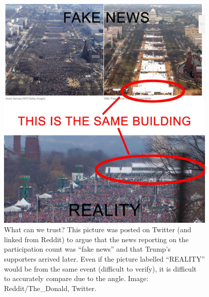 \begin{columns}[t]
  \hfill

  \begin{column}{0.32\linewidth}

    \begin{figure}
      \centering
      \includegraphics[width=0.9\linewidth]{fig/trump.jpg}
      \caption{%
        What can we trust?
        This picture was posted on Twitter (and linked from Reddit) to argue 
        that the news reporting on the participation count was \enquote{fake 
          news} and that Trump's supporters arrived later.
        Even if the picture labelled \enquote{REALITY} would be from the same 
        event (difficult to verify), it is difficult to accurately compare due 
        to the angle.
        Image: Reddit/The\_Donald, Twitter.
      }\label{TrumpInauguration}
    \end{figure}

  \end{column}

  \hfill

  \begin{column}{0.32\linewidth}


\end{column}
\end{columns}
